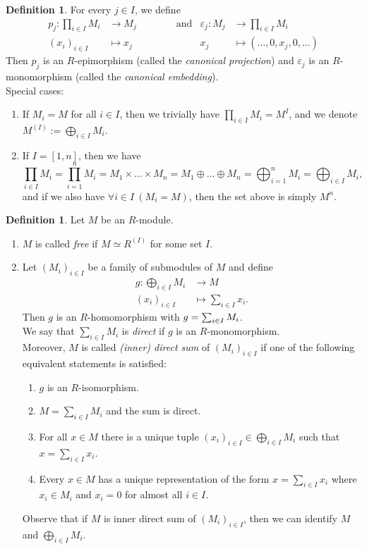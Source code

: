 \documentclass[12pt,a4paper]{report}
\theoremstyle{definition}
\newtheorem{defn}[theorem]{Definition}
\theoremstyle{num.custom-title}
\let\o\relax %
\DeclareMathOperator{\o}{\mathsf{o}}
\let\Im\relax %
\DeclareMathOperator{\Im}{Im}
\renewcommand{\epsilon}{\varepsilon}
\begin{document}
\begin{defn}
For every $j \in I$, we define 
\begin{align*}
p_j \colon \prod_{i \in I} M_i &\to M_j  \quad \quad \quad \quad \text{and}  &\epsilon_j \colon M_j &\to \prod_{i \in I} M_i \\
(x_i)_{i \in I} &\mapsto x_j    &x_j &\mapsto (\ldots,0,x_j,0,\ldots)
\end{align*}
Then $p_j$ is an $R$-epimorphism (called the \emph{canonical projection}) and $\epsilon_j$ is an $R$-monomorphism (called the \emph{canonical embedding}).\\
Special cases:
\begin{enumerate}
\item If $M_i = M$ for all $i \in I$, then we trivially have $\prod_{i \in I} M_i = M^I$, and we denote $M^{(I)} := \bigoplus_{i \in I} M_i$.
\item If $I=[1,n]$, then we have
\[
\prod_{i \in I} M_i = \prod_{i=1}^n M_i = M_1 \times \ldots \times M_n = M_1 \oplus \ldots \oplus M_n = \bigoplus_{i=1}^n M_i = \bigoplus_{i \in I} M_i,
\]
and if we also have $\forall i \in I \ (M_i=M)$, then the set above is simply $M^n$.
\end{enumerate}
\end{defn}

\begin{defn}\label{def-free_m-sum_dir}
Let $M$ be an $R$-module.
\begin{enumerate}
\item $M$ is called \emph{free} if $M \simeq R^{(I)}$ for some set $I$.
\item Let $(M_i)_{i \in I}$ be a family of submodules of $M$ and define
\begin{align*}
g \colon \bigoplus_{i \in I} M_i &\to M \\
(x_i)_{i \in I} &\mapsto \sum_{i \in I} x_i.
\end{align*}
Then $g$ is an $R$-homomorphism with $\Im g = \sum_{i \in I} M_i$.\\
We say that $\sum_{i \in I} M_i$ is \emph{direct} if $g$ is an $R$-monomorphism.\\
Moreover, $M$ is called \emph{(inner) direct sum} of $(M_i)_{i \in I}$ if one of the following equivalent statements is satisfied:
\begin{enumerate}
\item $g$ is an $R$-isomorphism.
\item $M=\sum_{i \in I} M_i$ and the sum is direct.
\item For all $x \in M$ there is a unique tuple $(x_i)_{i \in I} \in \bigoplus_{i \in I} M_i$ such that $x = \sum_{i \in I} x_i$.
\item Every $x \in M$ has a unique representation of the form $x = \sum_{i \in I} x_i$ where $x_i \in M_i$ and $x_i = 0$ for almost all $i \in I$.
\end{enumerate}
Observe that if $M$ is inner direct sum of $(M_i)_{i \in I}$, then we can identify $M$ and $\bigoplus_{i \in I} M_i$.
\end{enumerate}
\end{defn}
\end{document}

